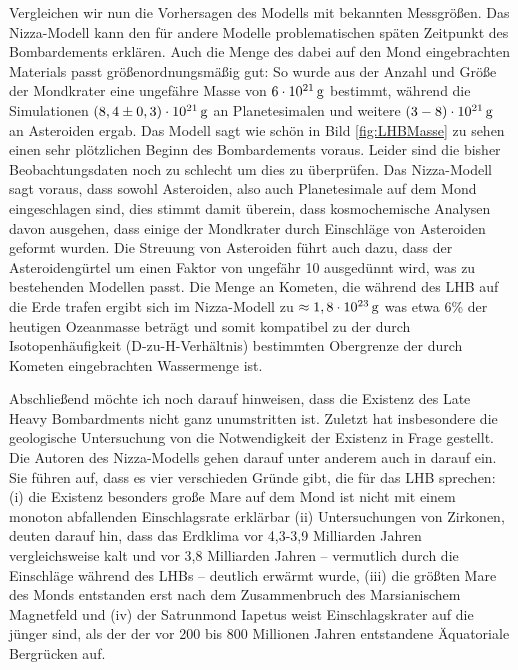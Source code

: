 \documentclass[12pt,a4paper,twoside]{article}
\renewcommand{\cite}{\citep}
\begin{document}
Vergleichen wir nun die Vorhersagen des Modells mit bekannten Messgrößen. Das Nizza-Modell kann den für andere Modelle problematischen späten Zeitpunkt des Bombardements erklären. Auch die Menge des dabei auf den Mond eingebrachten Materials passt größenordnungsmäßig gut: So wurde aus der Anzahl und Größe der Mondkrater eine ungefähre Masse von $\unit[6 \cdot 10^{21}]{g}$ bestimmt, während die Simulationen $\unit[\left(8,4 \pm 0,3\right) \cdot 10^{21}]{g}$ an Planetesimalen und weitere $\unit[\left( 3-8 \right) \cdot 10^{21}]{g}$ an Asteroiden ergab. %
Das Modell sagt wie schön in Bild \ref{fig:LHBMasse} zu sehen einen sehr plötzlichen Beginn des Bombardements voraus. Leider sind die bisher Beobachtungsdaten noch zu schlecht um dies zu überprüfen.
Das Nizza-Modell sagt voraus, dass sowohl Asteroiden, also auch Planetesimale auf dem Mond eingeschlagen sind, dies stimmt damit überein, dass kosmochemische Analysen davon ausgehen, dass einige der Mondkrater durch Einschläge von Asteroiden geformt wurden.
Die Streuung von Asteroiden führt auch dazu, dass der Asteroidengürtel um einen Faktor von ungefähr 10 ausgedünnt wird, was zu bestehenden Modellen passt.  %
Die Menge an Kometen, die während des LHB auf die Erde trafen ergibt sich im Nizza-Modell zu $\approx \unit[1,8 \cdot 10^{23}]{g}$ was etwa 6\% der heutigen Ozeanmasse beträgt und somit kompatibel zu der durch Isotopenhäufigkeit (D-zu-H-Verhältnis) bestimmten Obergrenze der durch Kometen eingebrachten Wassermenge ist\cite{Morbidelli2000, Gomes2005}.

Abschließend möchte ich noch darauf hinweisen, dass die Existenz des Late Heavy Bombardments nicht ganz unumstritten ist. Zuletzt hat insbesondere die geologische Untersuchung von \cite{Spudis2011} die Notwendigkeit der Existenz in Frage gestellt. Die Autoren des Nizza-Modells gehen darauf unter anderem auch in \cite{Brasser2009} darauf ein. Sie führen auf, dass es vier verschieden Gründe gibt, die für das LHB sprechen: (i) die Existenz besonders große Mare auf dem Mond ist nicht mit einem monoton abfallenden Einschlagsrate erklärbar (ii) Untersuchungen von Zirkonen, deuten darauf hin, dass das Erdklima vor 4,3-3,9 Milliarden Jahren vergleichsweise kalt und vor 3,8 Milliarden Jahren -- vermutlich durch die Einschläge während des LHBs -- deutlich erwärmt wurde, (iii) die größten Mare des Monds entstanden erst nach dem Zusammenbruch des Marsianischem Magnetfeld und (iv) der Satrunmond Iapetus weist Einschlagskrater auf die jünger sind, als der der vor 200 bis 800 Millionen Jahren entstandene Äquatoriale Bergrücken auf. %
\end{document}

